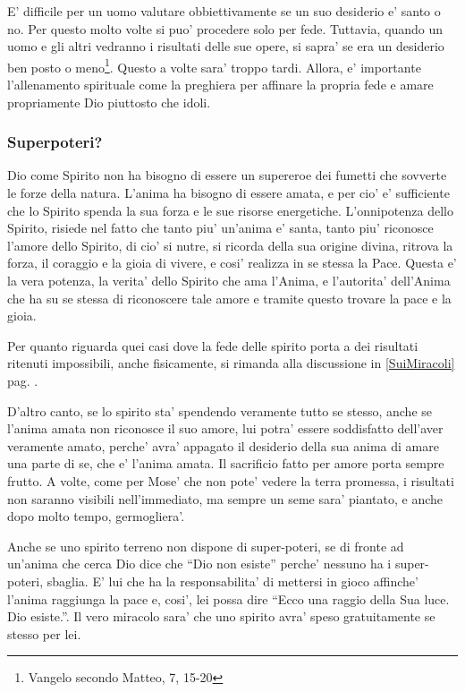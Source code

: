E' difficile per un uomo valutare obbiettivamente se un suo desiderio e' santo o no. Per questo molto volte si puo' procedere solo per fede. Tuttavia, quando un uomo e gli altri vedranno i risultati delle sue opere, si sapra' se era un desiderio ben posto o meno\footnote{Vangelo secondo Matteo, 7, 15-20}. Questo a volte sara' troppo tardi. Allora, e' importante l'allenamento spirituale come la preghiera per affinare la propria fede e amare propriamente Dio piuttosto che idoli.

\subsubsection{Superpoteri?}
\label{DioComeSpiritoSuperpoteri}

    Dio come Spirito non ha bisogno di essere un supereroe dei fumetti che sovverte le forze della natura. L'anima ha bisogno di essere amata, e per cio' e' sufficiente che lo Spirito spenda la sua forza e le sue risorse energetiche. L'onnipotenza dello Spirito, risiede nel fatto che tanto piu' un'anima e' santa, tanto piu' riconosce l'amore dello Spirito, di cio' si nutre, si ricorda della sua origine divina, ritrova la forza, il coraggio e la gioia di vivere, e cosi' realizza in se stessa la Pace.  Questa e' la vera potenza, la verita' dello Spirito che ama l'Anima, e l'autorita' dell'Anima che ha su se stessa di riconoscere tale amore e tramite questo trovare la pace e la gioia.
    
    Per quanto riguarda quei casi dove la fede delle spirito porta a dei risultati ritenuti impossibili, anche fisicamente, si rimanda alla discussione in \ref{SuiMiracoli} pag. \pageref{SuiMiracoli}.

    D'altro canto, se lo spirito sta' spendendo veramente tutto se stesso, anche se l'anima amata non riconosce il suo amore, lui potra' essere soddisfatto dell'aver veramente amato, perche' avra' appagato il desiderio della sua anima di amare una parte di se, che e' l'anima amata. Il sacrificio fatto per amore porta sempre frutto. A volte, come per Mose' che non pote' vedere la terra promessa, i risultati non saranno visibili nell'immediato, ma sempre un seme sara' piantato, e anche dopo molto tempo, germogliera'.

    Anche se uno spirito terreno non dispone di super-poteri, se di fronte ad un'anima che cerca Dio dice che ``Dio non esiste'' perche' nessuno ha i super-poteri, sbaglia. E' lui che ha la responsabilita' di mettersi in gioco affinche' l'anima raggiunga la pace e, cosi', lei possa dire ``Ecco una raggio della Sua luce. Dio esiste.''. Il vero miracolo sara' che uno spirito avra' speso gratuitamente se stesso per lei.


